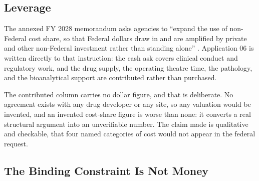 \subsection{Leverage}

The annexed FY 2028 memorandum asks agencies to ``expand the use of non-Federal
cost share, so that Federal dollars draw in and are amplified by private and
other non-Federal investment rather than standing alone''
\cite{kratsiosvought2026fy2028priorities}. Application 06 is written directly to
that instruction: the cash ask covers clinical conduct and regulatory work, and
the drug supply, the operating theatre time, the pathology, and the
bioanalytical support are contributed rather than purchased.

The contributed column carries no dollar figure, and that is deliberate. No
agreement exists with any drug developer or any site, so any valuation would be
invented, and an invented cost-share figure is worse than none: it converts a
real structural argument into an unverifiable number. The claim made is
qualitative and checkable, that four named categories of cost would not appear
in the federal request.

\subsection{The Binding Constraint Is Not Money}

